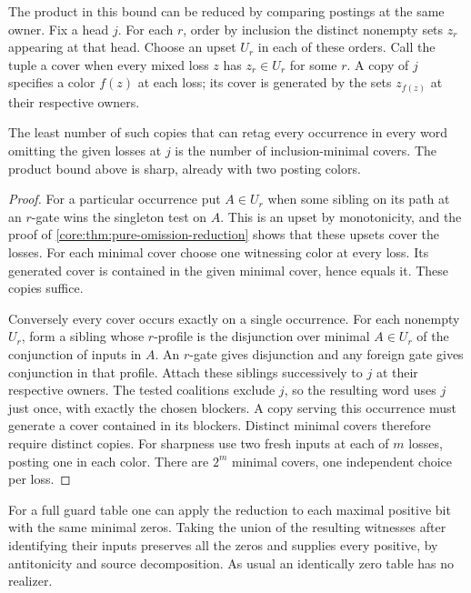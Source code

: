 The product in this bound can be reduced by comparing postings at the
same owner. Fix a head $j$. For each $r$, order by inclusion the distinct
nonempty sets $z_r$ appearing at that head. Choose an upset $U_r$ in
each of these orders. Call the tuple a cover when every mixed loss
$z$ has $z_r\in U_r$ for some $r$. A copy of $j$ specifies a color
$f(z)$ at each loss; its cover is generated by the sets $z_{f(z)}$
at their respective owners.

\begin{proposition}
\label{core:prop:minimal-blocker-covers}
The least number of such copies that can retag every occurrence in
every word omitting the given losses at $j$ is the number of
inclusion-minimal covers. The product bound above is sharp, already
with two posting colors.
\end{proposition}
\begin{proof}
For a particular occurrence put $A\in U_r$ when some sibling on its
path at an $r$-gate wins the singleton test on $A$. This is an upset
by monotonicity, and the proof of \cref{core:thm:pure-omission-reduction}
shows that these upsets cover the losses. For each minimal cover choose
one witnessing color at every loss. Its generated cover is contained
in the given minimal cover, hence equals it. These copies suffice.

Conversely every cover occurs exactly on a single occurrence. For each
nonempty $U_r$, form a sibling whose $r$-profile is the disjunction over
minimal $A\in U_r$ of the conjunction of inputs in $A$. An $r$-gate
gives disjunction and any foreign gate gives conjunction in that profile.
Attach these siblings successively to $j$ at their respective owners.
The tested coalitions exclude $j$, so the resulting word uses $j$
just once, with exactly the chosen blockers. A copy serving this
occurrence must generate a cover contained in its blockers. Distinct
minimal covers therefore require distinct copies. For sharpness use
two fresh inputs at each of $m$ losses, posting one in each color.
There are $2^m$ minimal covers, one independent choice per loss.
\end{proof}

For a full guard table one can apply the reduction to each maximal
positive bit with the same minimal zeros. Taking the union of the
resulting witnesses after identifying their inputs preserves all the
zeros and supplies every positive, by antitonicity and source
decomposition. As usual an identically zero table has no realizer.

